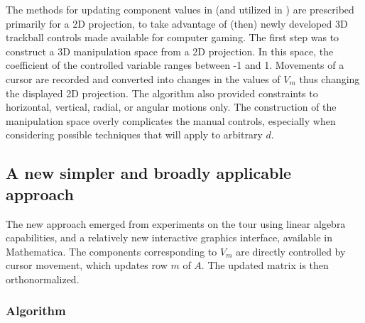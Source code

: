 \documentclass[]{interact}
\theoremstyle{plain}%
\theoremstyle{definition}
\theoremstyle{remark}
\begin{document}
The methods for updating component values in \citet{cook_manual_1997}
(and utilized in \citet{spyrison_spinifex_2020}) are prescribed
primarily for a 2D projection, to take advantage of (then) newly
developed 3D trackball controls made available for computer gaming. The
first step was to construct a 3D manipulation space from a 2D
projection. In this space, the coefficient of the controlled variable
ranges between -1 and 1. Movements of a cursor are recorded and
converted into changes in the values of \(V_m\) thus changing the
displayed 2D projection. The algorithm also provided constraints to
horizontal, vertical, radial, or angular motions only. The construction
of the manipulation space overly complicates the manual controls,
especially when considering possible techniques that will apply to
arbitrary \(d\).

\hypertarget{a-new-simpler-and-broadly-applicable-approach}{%
\subsection{A new simpler and broadly applicable
approach}\label{a-new-simpler-and-broadly-applicable-approach}}

The new approach emerged from experiments on the tour using linear
algebra capabilities, and a relatively new interactive graphics
interface, available in Mathematica. The components corresponding to
\(V_m\) are directly controlled by cursor movement, which updates row
\(m\) of \(A\). The updated matrix is then orthonormalized.

\hypertarget{algorithm}{%
\subsubsection{Algorithm}\label{algorithm}}
\end{document}
